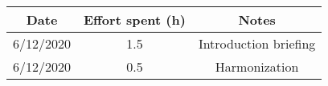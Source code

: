 \documentclass[../../main.tex]{subfiles}
\begin{document}
    \begin{center}
        \begin{tabular}{|c| |c| |c|} 
            \hline
            Date & Effort spent (h) & Notes\\ [0.5ex] 
            \hline\hline
            6/12/2020 & 1.5 & Introduction briefing\\ 
            6/12/2020 & 0.5 & Harmonization\\
            \hline
        \end{tabular}
    \end{center}
\end{document}
